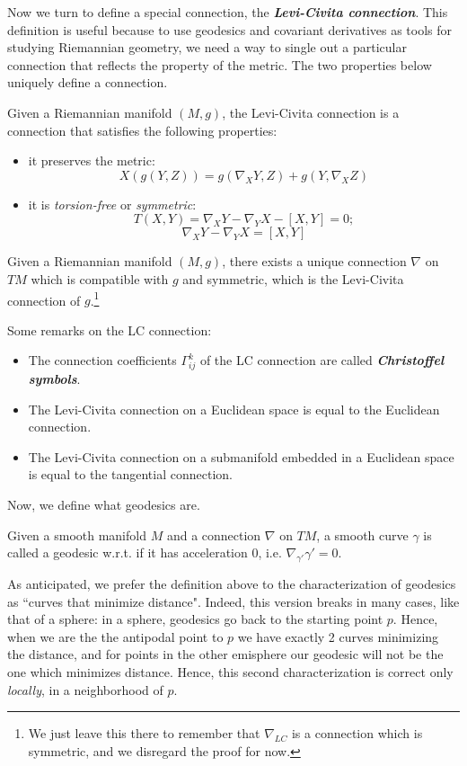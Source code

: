 \documentclass[a4paper,12pt,reqno]{amsbook}
\theoremstyle{definition} %
\newcommand{\1}{\mathbbm{1}}
\theoremstyle{plain}
\theoremstyle{remark}
\begin{document}
Now we turn to define a special connection, the \textbf{\emph{Levi-Civita connection}}. This definition is useful because to use geodesics and covariant derivatives as tools for studying Riemannian geometry, we need a way to single out a particular connection that reflects the property of the metric. The two properties below uniquely define a connection. 
\begin{definition}
    Given a Riemannian manifold $(M,g)$, the Levi-Civita connection is a connection that satisfies the following properties: 
    \begin{itemize}
        \item[$\circ$] it preserves the metric:\[ X(g(Y,Z)) = g(\nabla_XY,Z) + g(Y, \nabla_X Z)\] 
        \item[$\circ$] it is \emph{torsion-free} or \emph{symmetric}:\[T(X,Y) = \nabla_XY-\nabla_YX-[X,Y] = 0;\]
        \[
         \nabla_XY-\nabla_YX=[X,Y]
        \]
    \end{itemize}
    
\end{definition}
\begin{theorem}
Given a Riemannian manifold $(M,g)$, there exists a unique connection $\nabla$ on $TM$ which is compatible with $g$ and symmetric, which is the Levi-Civita connection of $g$.\footnote{We just leave this there to remember that $\nabla_{LC}$ is a connection which is symmetric, and we disregard the proof for now.}
\end{theorem}

Some remarks on the LC connection:
\begin{itemize}
    \item The connection coefficients $\Gamma^k_{ij}$ of the LC connection are called \textbf{\emph{Christoffel symbols}}.
    \item The Levi-Civita connection on a Euclidean space is equal to the Euclidean connection.
    \item The Levi-Civita connection on a submanifold embedded in a Euclidean space is equal to the tangential connection. 
\end{itemize}

Now, we define what geodesics are.
\begin{definition}[Geodesic]
    Given a smooth manifold $M$ and a connection $\nabla$ on $TM$, a smooth curve $\gamma$ is called a geodesic w.r.t. if it has acceleration 0, i.e. $\nabla_{\gamma'} \gamma'=0$. 
\end{definition}
\begin{remark}
    As anticipated, we prefer the definition above to the characterization of geodesics as ``curves that minimize distance". Indeed, this version breaks in many cases, like that of a sphere: in a sphere, geodesics go back to the starting point $p$. Hence, when we are the the antipodal point to $p$ we have exactly 2 curves minimizing the distance, and for points in the other emisphere our geodesic will not be the one which minimizes distance. Hence, this second characterization is correct only \emph{locally}, in a neighborhood of $p$.
\end{remark}
\end{document}
